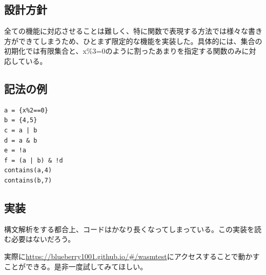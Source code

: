 \documentclass[a4paper,11pt]{ltjsarticle}
\begin{document}
\subsection{設計方針}
全ての機能に対応させることは難しく、特に関数で表現する方法では様々な書き方ができてしまうため、ひとまず限定的な機能を実装した。具体的には、集合の初期化では有限集合と、x\%3=0のように割ったあまりを指定する関数のみに対応している。
\subsection{記法の例}
\begin{lstlisting}
a = {x%2==0}
b = {4,5}
c = a | b
d = a & b
e = !a
f = (a | b) & !d
contains(a,4)
contains(b,7)
\end{lstlisting}
\subsection{実装}
構文解析をする都合上、コードはかなり長くなってしまっている。この実装を読む必要はないだろう。

実際に\url{https://blueberry1001.github.io/#/wasmtest}にアクセスすることで動かすことができる。是非一度試してみてほしい。
\end{document}
